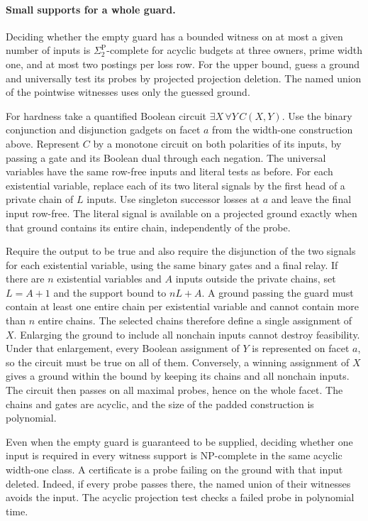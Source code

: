 \paragraph{Small supports for a whole guard.}
Deciding whether the empty guard has a bounded
witness on at most a given number of inputs is
$\Sigma_2^{\mathrm P}$-complete for acyclic
budgets at three owners, prime width one, and
at most two postings per loss row. For the
upper bound, guess a ground and universally
test its probes by projected projection deletion.
The named union of the pointwise witnesses
uses only the guessed ground.

For hardness take a quantified Boolean circuit
$\exists X\,\forall Y\,C(X,Y)$. Use the binary
conjunction and disjunction gadgets on facet
$a$ from the width-one construction above.
Represent $C$ by a monotone circuit on both
polarities of its inputs, by passing a gate
and its Boolean dual through each negation.
The universal variables have the same row-free
inputs and literal tests as before. For each
existential variable, replace each of its two
literal signals by the first head of a private
chain of $L$ inputs. Use singleton successor
losses at $a$ and leave the final input row-free.
The literal signal is available on a projected
ground exactly when that ground contains its
entire chain, independently of the probe.

Require the output to be true and also require
the disjunction of the two signals for each
existential variable, using the same binary
gates and a final relay. If there are $n$
existential variables and $A$ inputs outside
the private chains, set $L=A+1$ and the
support bound to $nL+A$. A ground passing
the guard must contain at least one entire
chain per existential variable and cannot
contain more than $n$ entire chains. The
selected chains therefore define a single
assignment of $X$. Enlarging the ground to
include all nonchain inputs cannot destroy
feasibility. Under that enlargement, every
Boolean assignment of $Y$ is represented on
facet $a$, so the circuit must be true on
all of them. Conversely, a winning assignment
of $X$ gives a ground within the bound by
keeping its chains and all nonchain inputs.
The circuit then passes on all maximal
probes, hence on the whole facet. The
chains and gates are acyclic, and the size
of the padded construction is polynomial.

Even when the empty guard is guaranteed to
be supplied, deciding whether one input is
required in every witness support is
NP-complete in the same acyclic width-one
class. A certificate is a probe failing on
the ground with that input deleted. Indeed,
if every probe passes there, the named union
of their witnesses avoids the input. The
acyclic projection test checks a failed probe
in polynomial time.

